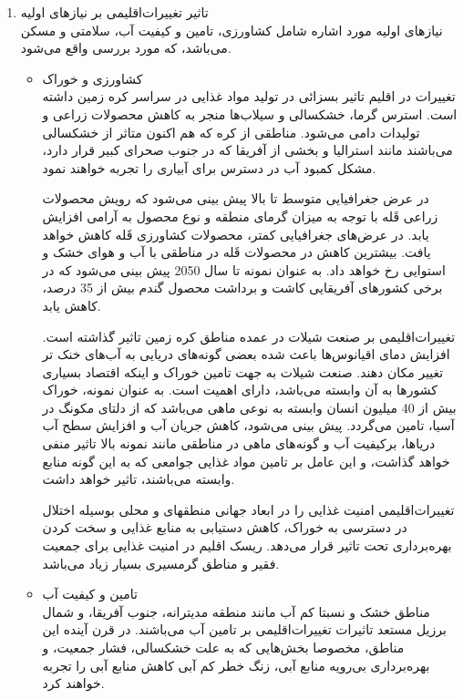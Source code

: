 \begin{enumerate}
	
			\item	تاثیر تغییرات‌اقلیمی بر نیاز‌های اولیه\\
نیاز‌های اولیه مورد اشاره شامل کشاورزی، تامین و کیفیت آب، سلامتی و مسکن می‌باشد، که مورد بررسی واقع می‌شود. 
				\begin{itemize}
					\item کشاورزی و خوراک\\
تغییرات در اقلیم تاثیر بسزائی در تولید مواد غذایی در سراسر کره زمین داشته است. استرس گرما، خشکسالی و سیلاب‌ها منجر به کاهش محصولات زراعی و تولیدات دامی می‌شود. مناطقی از کره که هم اکنون متاثر از خشکسالی می‌باشند مانند استرالیا و بخشی از آفریقا که در جنوب صحرای کبیر قرار دارد، مشکل کمبود آب در دسترس برای آبیاری را تجربه خواهند نمود.

در عرض جغرافیایی متوسط تا بالا پیش بینی می‌شود که رویش محصولات زراعی قَله با توجه به میزان گرمای منطقه و نوع محصول به آرامی افزایش یابد. در عرض‌های جغرافیایی کمتر، محصولات کشاورزی قَله کاهش خواهد یافت. بیشترین کاهش در محصولات قَله در مناطقی با آب و هوای خشک و استوایی رخ خواهد داد. به عنوان نمونه تا سال 2050 پیش بینی می‌شود که در برخی کشور‌های آفریقایی کاشت و برداشت محصول گندم بیش از 35 درصد، کاهش یابد. 

تغییرات‌اقلیمی بر صنعت شیلات در عمده مناطق کره زمین تاثیر گذاشته است. افزایش دمای اقیانوس‌ها باعث شده بعضی گونه‌های دریایی به آب‌های خنک تر تغییر مکان دهند. صنعت شیلات به جهت تامین خوراک و اینکه اقتصاد بسیاری کشور‌ها به آن وابسته می‌باشد، دارای اهمیت است. به عنوان نمونه، خوراک بیش از 40 میلیون انسان وابسته به نوعی ماهی می‌باشد که از دلتای مکونگ در آسیا، تامین می‌گردد. پیش بینی می‌شود، کاهش جریان آب و افزایش سطح آب دریاها، برکیفیت آب و گونه‌های ماهی در مناطقی مانند نمونه بالا تاثیر منفی خواهد گذاشت، و این عامل بر تامین مواد غذایی جوامعی که به این گونه منابع وابسته می‌باشند، تاثیر خواهد داشت.

				تغییرات‌اقلیمی امنیت غذایی را در ابعاد جهانی منطقهای و محلی بوسیله اختلال در دسترسی به خوراک، کاهش دستیابی به منابع غذایی و سخت کردن بهره‌برداری تحت تاثیر قرار می‌دهد. ریسک اقلیم در امنیت غذایی برای جمعیت فقیر و مناطق گرمسیری بسیار زیاد می‌باشد.
				 \\
					\item تامین و کیفیت آب\\
مناطق خشک و نسبتا کم آب مانند منطقه مدیترانه، جنوب آفریقا، و شمال برزیل مستعد تاثیرات تغییرات‌اقلیمی بر تامین آب می‌باشند. در قرن آینده این مناطق، مخصوصا بخش‌هایی که به علت خشکسالی، فشار جمعیت، و بهره‌برداری بی‌رویه منابع آبی، زنگ خطر کم آبی کاهش منابع آبی را تجربه خواهند کرد.


\end{itemize}
\end{enumerate}
